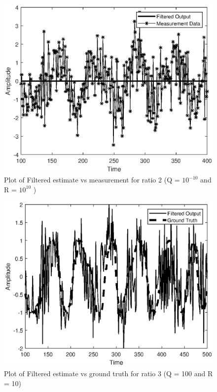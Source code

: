 \documentclass{article}
\begin{document}
\begin{figure}
\centering
\includegraphics[scale=0.50]{ratio2_filt_vs_measure.eps}
\caption{Plot of Filtered estimate vs measurement for ratio 2 (Q = $10^{-10}$ and R = $10^{10}$ )}
\label{fig:fourth}
\end{figure}
\begin{figure}
\centering
\includegraphics[scale=0.60]{ratio3_filt_vs_ground.eps}
\caption{Plot of Filtered estimate vs ground truth for ratio 3 (Q = 100 and R = 10)}
\label{fig:fifth}
\end{figure}
\end{document}
